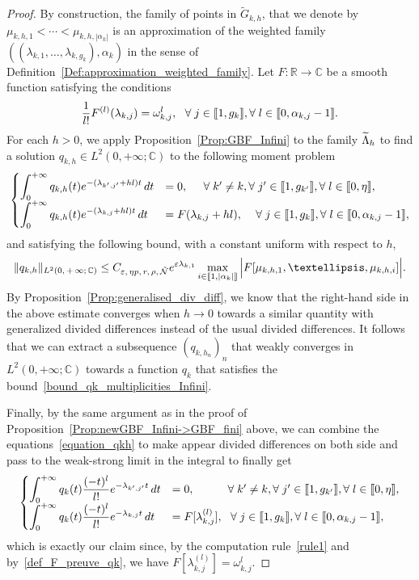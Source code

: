 \documentclass[11pt]{article}
\theoremstyle{definition}
\numberwithin{equation}{section}
\numberwithin{figure}{section}
\numberwithin{table}{section}
\newcommand{\llbracket}{\mathopen{[\mkern -2.7mu[}}
\newcommand{\rrbracket}{\mathclose{]\mkern -2.7mu]}}
\newcommand{\inter}[2]{\llbracket #1,#2 \rrbracket}
\newcommand{\n}{g}
\newcommand{\NN}{\mathcal{N}}
\newcommand{\R}{\mathbb{R}}
\newcommand{\C}{\mathbb{C}}
\let\oldtilde\tilde
\renewcommand*{\tilde}[1]{\mathchoice{\widetilde{#1}}{\widetilde{#1}}{\oldtilde{#1}}{\oldtilde{#1}}}\let\oldexists\exists
\renewcommand*{\exists}{\mathrel{\oldexists}}
\let\oldforall\forall
\renewcommand*{\forall}{\mathrel{\oldforall}}
\begin{document}
\begin{proof}
By construction, the family of points in $\widetilde{G}_{k,h}$, that we denote by $\mu_{k,h,1} < \dotsm < \mu_{k,h,|\alpha_k|}$ is an approximation of the weighted family $((\lambda_{k,1},\dotsc,\lambda_{k,\n_k}), \alpha_k)$ in the sense of Definition~\ref{Def:approximation_weighted_family}. Let $F:\R\to \C$ be a smooth function satisfying the conditions
\begin{equation}\label{def_F_preuve_qk}
\frac{1}{l!} F^{(l)} (\lambda_{k,j}) = \omega_{k,j}^l, \ \ \forall j\in \inter{1}{\n_k}, \forall l\in \inter{0}{\alpha_{k,j}-1}.
\end{equation}
For each $h>0$, we apply Proposition~\ref{Prop:GBF_Infini} to the family $\tilde{\Lambda}_h$ to find a solution $q_{k,h}\in L^2(0,+\infty;\C)$ to the following moment problem
\begin{equation}\label{equation_qkh}
\begin{cases}
\displaystyle\int_0^{+\infty} q_{k,h}(t) e^{-(\lambda_{k',j'} + hl) t} \, dt & = 0, \mkern25mu \forall k'\neq k, \forall j'\in \inter{1}{\n_{k'}}, \forall l\in \inter{0}{\eta},\\[0.15em]
\displaystyle\int_0^{+\infty} q_{k,h}(t) e^{-(\lambda_{k,j}+hl) t} \, dt & = F(\lambda_{k,j}+hl), \quad\, \forall j\in \inter{1}{\n_{k}}, \forall l\in \inter{0}{\alpha_{k,j}-1},
\end{cases}
\end{equation}
and satisfying the following bound, with a constant uniform with respect to $h$,
\[
\|q_{k,h}\|_{L^2(0,\,+\,\infty;\,\C)} \leq C_{\varepsilon,\, \eta p,\,r,\, \rho,\, \tilde{\NN}} e^{\varepsilon \lambda_{k,1}} \max \limits_{i\in \inter{1}{|\alpha_k|}} \Big| F[\mu_{k,h,1}, \dots, \mu_{k,h,i}] \Big|.
\]
By Proposition~\ref{Prop:generalised_div_diff}, we know that the right-hand side in the above estimate converges when $h\to 0$ towards a similar quantity with generalized divided differences instead of the usual divided differences. It follows that we can extract a subsequence $(q_{k,h_n})_n$ that weakly converges in $L^2(0,+\infty;\C)$ towards a function $q_k$ that satisfies the bound~\eqref{bound_qk_multiplicities_Infini}.

Finally, by the same argument as in the proof of Proposition~\ref{Prop:newGBF_Infini->GBF_fini} above, we can combine the equations~\eqref{equation_qkh} to make appear divided differences on both side and pass to the weak-strong limit in the integral to finally get
\begin{equation*}\label{equation_qk}
\begin{cases}
\displaystyle\int_0^{+\infty} q_{k}(t) \frac{(-t)^l}{l!} e^{-\lambda_{k',j'}t} \, dt & = 0, \mkern53mu \forall k'\neq k, \forall j'\in \inter{1}{\n_{k'}}, \forall l\in \inter{0}{\eta},\\[0.15em]
\displaystyle\int_0^{+\infty} q_{k}(t) \frac{(-t)^l}{l!} e^{-\lambda_{k,j}t} \, dt & = F[\lambda_{k,j}^{(l)}], \ \ \forall j\in \inter{1}{\n_{k}}, \forall l\in \inter{0}{\alpha_{k,j}-1},
\end{cases}
\end{equation*}
which is exactly our claim since, by the computation rule~\eqref{rule1} and by~\eqref{def_F_preuve_qk}, we have $F[\lambda_{k,j}^{(l)}] = \omega_{k,j}^l$.
\end{proof}
\end{document}
